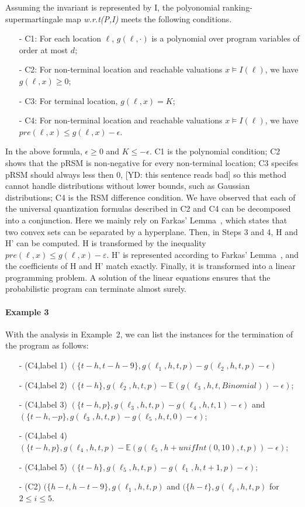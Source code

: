 \documentclass[runningheads]{llncs}
\newcommand\yx[1]{{\color{red} [YD: #1]}}
\begin{document}
Assuming the invariant is represented by I, the polyonomial ranking-supermartingale map \textit{w.r.t(P,I)} meets the following conditions.
\begin{itemize}
	\item[-] C1: For each location $\ell$, $g(\ell,\cdot)$ is a polynomial over program variables of order at most $d$;
	\item[-] C2: For non-terminal location and reachable
	valuations $x \vDash I(\ell)$, we have $g(\ell,x) \geq 0$;
	\item[-] C3: For terminal location, $g(\ell,x)=K$;
	\item[-] C4: For non-terminal location and reachable
	valuations $x \vDash I(\ell)$, we have $pre(\ell,x) \leq g(\ell,x)-\epsilon$.
\end{itemize}
In the above formula, $\epsilon \geq 0$ and $K \leq -\epsilon$. C1 is the polynomial condition; C2 shows that the pRSM is non-negative for every non-terminal location; C3 specifes pRSM should always less then 0,
\yx{this sentence reads bad} so this method cannot handle distributions without lower bounds, such as Gaussian distributions; C4 is the RSM difference condition.
We have observed that each of the universal quantization formulas described in C2 and C4 can be decomposed into a conjunction. Here we mainly rely on  Farkas' Lemma~\cite{Farkas1894}, which states that two convex sets can be separated by a hyperplane. Then, in Steps 3 and 4, H and H' can be computed. H is transformed by the inequality $pre(\ell,x)\leq g(\ell,x)-\varepsilon$. H' is represented according to Farkas' Lemma~\cite{Farkas1894}, and the coefficients of H and H' match exactly. Finally, it is transformed into a linear programming problem. %
A solution of the linear equations ensures that the probabilistic program can terminate almost surely.

\paragraph{Example 3} With the analysis in Example~2, we can list the instances for the termination of the program as follows:
\begin{itemize}
	\item[-] (C4,label 1) $(\{t-h, t-h-9\}, g(\ell_1,h,t,p)-g(\ell_2,h,t,p)-\epsilon)$
	\item[-] (C4,label 2) $(\{t-h\}, g(\ell_2,h,t,p)-\mathbb{E}(g(\ell_3,h,t,Binomial))-\epsilon)$;
	\item[-] (C4,label 3) $(\{t-h, p\}, g(\ell_3,h,t,p)-g(\ell_4,h,t,1)-\epsilon)$ and $(\{t-h, -p\}, g(\ell_3,h,t,p)-g(\ell_5,h,t,0)-\epsilon)$;
	\item[-] (C4,label 4) $(\{t-h, p\},g(\ell_4,h,t,p)-\mathbb{E}(g(\ell_5,h+unifInt(0,10),t,p))-\epsilon)$;
	\item[-] (C4,label 5) $(\{t-h\}, g(\ell_5,h,t,p)-g(\ell_1,h,t+1,p)-\epsilon)$;
	\item[-] (C2) $(\{h-t,h-t-9\}, g(\ell_1,h,t,p)$ and $(\{h-t\}, g(\ell_i,h,t,p)$ for $2\leq i \leq 5$.
\end{itemize}
\end{document}

